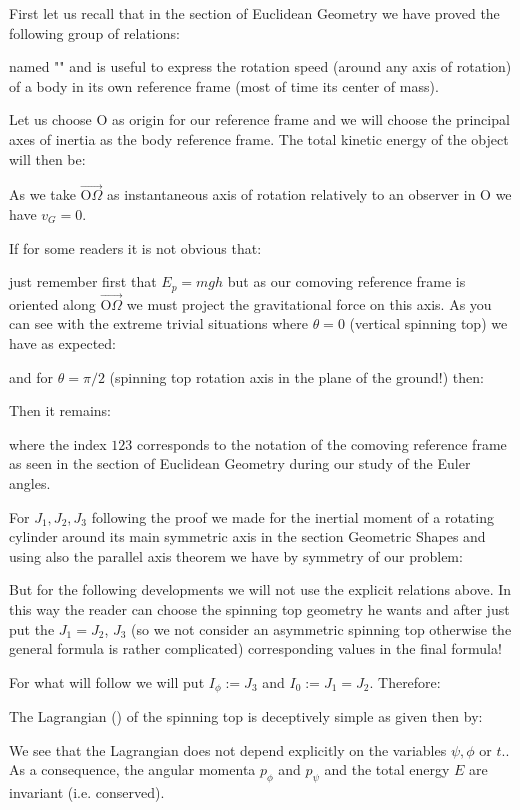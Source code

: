	First let us recall that in the section of Euclidean Geometry we have proved the following group of relations:
	
	named "" and is  useful to express the rotation speed (around any axis of rotation) of a body in its own reference frame (most of time its center of mass).

	Let us choose O as origin for our reference frame  and we will choose the principal axes of inertia as the body reference frame. The total kinetic energy of the object will then be:
	
	As we take $\overrightarrow{\text{O}\Omega}$ as instantaneous axis of rotation relatively to an observer in O we have $v_G=0$.
	
	If for some readers it is not obvious that: 
	
	just remember first that $E_p=mgh$ but as our comoving reference frame is oriented along $\overrightarrow{\text{O}\Omega}$ we must project the gravitational force on this axis. As you can see with the extreme trivial situations where $\theta=0$ (vertical spinning top) we have as expected:
	
	and for $\theta=\pi/2$ (spinning top rotation axis in the plane of the ground!) then:
	
	
	Then it remains:
	
	where the index $123$ corresponds to the notation of the comoving reference frame as seen in the section of Euclidean Geometry during our study of the  Euler angles.

	For $J_1,J_2,J_3$ following the proof we made for the inertial moment of a rotating cylinder around its main symmetric axis in the section Geometric Shapes and using also the parallel axis theorem we have by symmetry of our problem:
	
	But for the following developments we will not use the explicit relations above. In this way the reader can choose the spinning top geometry he wants and after just put the $J_1=J_2$, $J_3$ (so we not consider an asymmetric spinning top otherwise the general formula is rather complicated) corresponding values in the final formula!
	
	For what will follow we will put $I_\phi:=J_3$ and $I_0:=J_1=J_2$. Therefore:
	

	The Lagrangian () of the spinning top is deceptively simple as given then by:
	
	We see that the Lagrangian does not depend explicitly on the variables $\psi,\phi$ or $t$.. As a consequence, the angular momenta $p_\phi$ and $p_\psi$ and the total energy $E$ are invariant (i.e. conserved).
	
